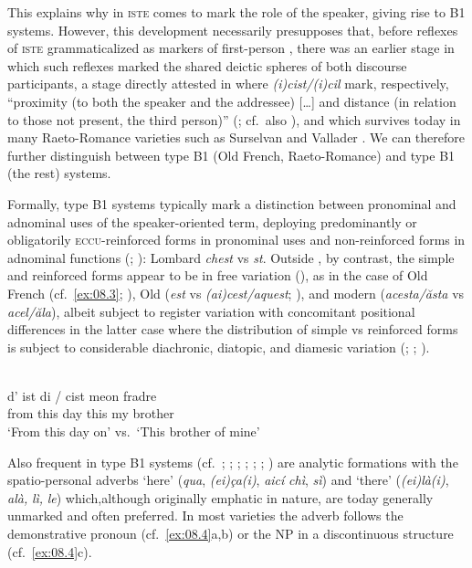 \documentclass[output=paper]{langsci/langscibook}
\begin{document}
This explains why in  \textsc{iste} comes to mark the role of the
speaker, giving rise to \textsc{B1} systems. However, this development
necessarily presupposes that, before reflexes of \textsc{iste} grammaticalized
as markers of first-person , there was an earlier stage in which such
reflexes marked the shared deictic spheres of both discourse participants, a
stage directly attested in  where \emph{(i)cist/(i)cil} mark,
respectively, \enquote{proximity (to both the speaker and the addressee)
[\dots] and distance (in relation to those not present, the third person)}
(\citealt[s.v.\ ce2]{CNRTL:aa}; cf.\ also \citealt[293f]{Nyrop:1925ab}), and
which survives today in many Raeto-Romance varieties such as Surselvan and
Vallader \citep[§2.2.1.1]{Sornicola:2011a}. We can therefore further
distinguish be\-tween type B1 (Old French, Raeto-Romance) and type
B1 (the rest) systems.

Formally,  type B1 systems typically mark a distinction
between pronominal and adnominal uses of the speaker-oriented term, deploying
predominantly or obligatorily \textsc{eccu}{}-reinforced forms in pronominal
uses and non-reinforced forms in adnominal functions
(\citealt[206]{Rohlfs:1968a}; \citealt[13f]{Irsara:2009a}): Lombard
\emph{chest} vs \emph{st}. Outside , by contrast, the simple
and reinforced forms appear to be in free variation
(\citealt[§2.2.1.1]{Sornicola:2011a}), as in the case of Old French (cf.\
\ref{ex:08.3}; \citealt[416]{Nyrop:1925a}), Old 
(\emph{est} vs \emph{(ai)cest/aquest}; \citealt[109]{Grandgent:1909a}), and
modern \ili{Romanian} (\emph{acesta/ăsta} vs \emph{acel/ăla}), albeit subject
to register variation with concomitant positional differences in the latter
case where the distribution of simple vs reinforced forms is subject to
considerable diachronic, diatopic, and diamesic variation (\citealt[157,
161f]{Sandfeld:2019a}; \citealt[418]{Caragiu-Marioteanu:1989a};
\citealt[503--505]{Manea:2012a}).

\ea\label{bkm:Ref370483902}\langinfo{Old French}{}{\emph{Strasbourg}
\emph{oaths}}\label{ex:08.3}\\
\gll d’  ist  di \textup{\quad /\quad}  cist  meon  fradre  \\
from  this  day {} this  my  brother\\
\glt    \enquote*{From this day on} vs.\ \enquote*{This brother of mine}\z

Also frequent in type B1 systems (cf.\ \citealt[282f]{Arnaud:1920a};
\citealt[112]{Vanelli:1997a}; \citealt[84, 182]{Marcato:1998a};
\citealt[65]{Salvat:1998a}; \citealt{Bernstein1997}; \citealt[34--48,
107f]{Irsara:2009a}; \citealt{Cordin:2016a}) are analytic formations with the
spatio-personal adverbs ‘here’ (\emph{qua}, \emph{(ei)ça(i)}, \emph{aicí}
\emph{chì}, \emph{sì}) and ‘there’ (\emph{(ei)là(i)}, \emph{alà,} \emph{lì,}
\emph{le}) which,\linebreak although originally emphatic in nature, are today generally
unmarked and often preferred. In most varieties the adverb follows the
demonstrative pronoun (cf.~\ref{ex:08.4}a,b) or the NP in a
discontinuous structure (cf.\ \ref{ex:08.4}c).
\end{document}
